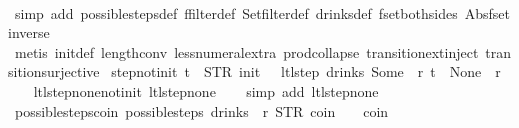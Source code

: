 \begin{isabellebody}
%
\isadelimproof
\ \ %
\endisadelimproof
%
\isatagproof
{}\isamarkupfalse%
\ {\isacharparenleft}simp\ add{\isacharcolon}\ possible{\isacharunderscore}steps{\isacharunderscore}def\ ffilter{\isacharunderscore}def\ Set{\isachardot}filter{\isacharunderscore}def\ drinks{\isacharunderscore}def\ fset{\isacharunderscore}both{\isacharunderscore}sides\ Abs{\isacharunderscore}fset{\isacharunderscore}inverse{\isacharparenright}\isanewline
\ \ \isamarkupfalse%
\ {\isacharparenleft}metis\ init{\isacharunderscore}def\ length{\isacharunderscore}{}{\isacharunderscore}conv\ less{\isacharunderscore}numeral{\isacharunderscore}extra{\isacharparenleft}{}{\isacharparenright}\ prod{\isachardot}collapse\ transition{\isachardot}ext{\isacharunderscore}inject\ transition{\isachardot}surjective{\isacharparenright}%
\endisatagproof
{\isafoldproof}%
%
\isadelimproof
\isanewline
%
\endisadelimproof
\isanewline
{}\isamarkupfalse%
\ step{\isacharunderscore}not{\isacharunderscore}init{\isacharcolon}\ {\isachardoublequoteopen}t\ {\isasymnoteq}\ {\isacharparenleft}STR\ {\isacharprime}{\isacharprime}init{\isacharprime}{\isacharprime}{\isacharcomma}\ {\isacharbrackleft}{\isacharbrackright}{\isacharparenright}\ {\isasymLongrightarrow}\ ltl{\isacharunderscore}step\ drinks\ {\isacharparenleft}Some\ {}{\isacharparenright}\ r\ t\ {\isacharequal}\ {\isacharparenleft}None{\isacharcomma}\ {\isacharbrackleft}{\isacharbrackright}{\isacharcomma}\ r{\isacharparenright}{\isachardoublequoteclose}\isanewline
%
\isadelimproof
\ \ %
\endisadelimproof
%
\isatagproof
{}\isamarkupfalse%
\ ltl{\isacharunderscore}step{\isacharunderscore}none{\isacharunderscore}not{\isacharunderscore}init\ ltl{\isacharunderscore}step{\isacharunderscore}none\isanewline
\ \ \isamarkupfalse%
\ {\isacharparenleft}simp\ add{\isacharcolon}\ ltl{\isacharunderscore}step{\isacharunderscore}none{\isacharunderscore}{}{\isacharparenright}%
\endisatagproof
{\isafoldproof}%
%
\isadelimproof
\isanewline
%
\endisadelimproof
\isanewline
{}\isamarkupfalse%
\ possible{\isacharunderscore}steps{\isacharunderscore}coin{\isacharcolon}\ {\isachardoublequoteopen}possible{\isacharunderscore}steps\ drinks\ {}\ r\ STR\ {\isacharprime}{\isacharprime}coin{\isacharprime}{\isacharprime}\ {\isacharbrackleft}{\isacharbrackright}\ {\isacharequal}\ {\isacharbraceleft}{\isacharbar}{\isacharparenleft}{}{\isacharcomma}\ coin{\isacharparenright}{\isacharbar}{\isacharbraceright}{\isachardoublequoteclose}\isanewline

\end{isabellebody}
